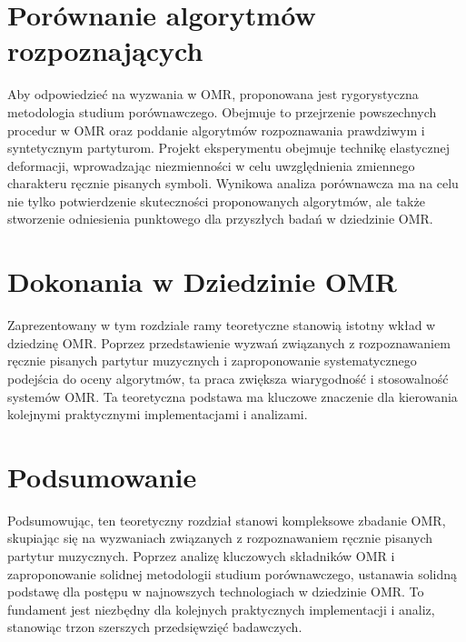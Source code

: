\documentclass[12pt]{report}
\begin{document}
\section{Porównanie algorytmów rozpoznających}

Aby odpowiedzieć na wyzwania w OMR, proponowana jest rygorystyczna metodologia studium porównawczego. Obejmuje to przejrzenie powszechnych procedur w OMR oraz poddanie algorytmów rozpoznawania prawdziwym i syntetycznym partyturom. Projekt eksperymentu obejmuje technikę elastycznej deformacji, wprowadzając niezmienności w celu uwzględnienia zmiennego charakteru ręcznie pisanych symboli. Wynikowa analiza porównawcza ma na celu nie tylko potwierdzenie skuteczności proponowanych algorytmów, ale także stworzenie odniesienia punktowego dla przyszłych badań w dziedzinie OMR.

\section{Dokonania w Dziedzinie OMR}

Zaprezentowany w tym rozdziale ramy teoretyczne stanowią istotny wkład w dziedzinę OMR. Poprzez przedstawienie wyzwań związanych z rozpoznawaniem ręcznie pisanych partytur muzycznych i zaproponowanie systematycznego podejścia do oceny algorytmów, ta praca zwiększa wiarygodność i stosowalność systemów OMR. Ta teoretyczna podstawa ma kluczowe znaczenie dla kierowania kolejnymi praktycznymi implementacjami i analizami.

\section{Podsumowanie}

Podsumowując, ten teoretyczny rozdział stanowi kompleksowe zbadanie OMR, skupiając się na wyzwaniach związanych z rozpoznawaniem ręcznie pisanych partytur muzycznych. Poprzez analizę kluczowych składników OMR i zaproponowanie solidnej metodologii studium porównawczego, ustanawia solidną podstawę dla postępu w najnowszych technologiach w dziedzinie OMR. To fundament jest niezbędny dla kolejnych praktycznych implementacji i analiz, stanowiąc trzon szerszych przedsięwzięć badawczych.
\end{document}

